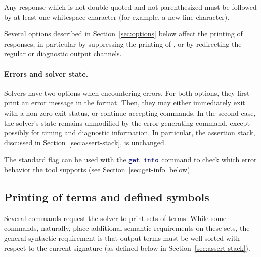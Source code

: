 Any response which is not double-quoted and not parenthesized must be followed
by at least one whitespace character (for example, a new line character).

Several options described in Section~\ref{sec:options} below affect the printing 
of responses, in particular by suppressing the printing of , 
or by redirecting the regular or diagnostic output channels.

\paragraph{Errors and solver state.} 
Solvers have two options when encountering errors.  
For both options, they first print an error message 
in the  format.  
Then, they may either immediately exit with a non-zero exit status, 
or continue accepting commands.  
In the second case, 
the solver's state remains unmodified by the error-generating command, 
except possibly for timing and diagnostic information.  
In particular, the assertion stack, discussed in Section~\ref{sec:assert-stack}, 
is unchanged.

The standard  flag can be used 
with the $\ter{get-info}$ command to check which error behavior 
the tool supports (see Section~\ref{sec:get-info} below).

\subsection{Printing of terms and defined symbols} 
Several commands request the solver to print sets of terms.  
While some commands, naturally, place additional semantic requirements on these sets, 
the general syntactic requirement is that output terms must be well-sorted 
with respect to the current signature (as defined below in Section~\ref{sec:assert-stack}).
%

